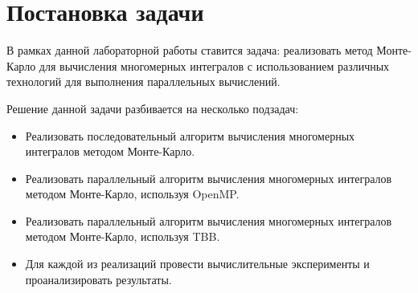 \documentclass{report}
\begin{document}
\section*{Постановка задачи}
В рамках данной лабораторной работы ставится задача: реализовать метод Монте-Карло для вычисления многомерных интегралов с использованием различных технологий для выполнения параллельных вычислений.
\par Решение данной задачи разбивается на несколько подзадач:
\begin{itemize}
\item Реализовать последовательный алгоритм вычисления многомерных интегралов методом Монте-Карло.
\item Реализовать параллельный алгоритм вычисления многомерных интегралов методом Монте-Карло, используя OpenMP.
\item Реализовать параллельный алгоритм вычисления многомерных интегралов методом Монте-Карло, используя TBB.
\item Для каждой из реализаций провести вычислительные эксперименты и проанализировать результаты.
\end{itemize}

\newpage
\end{document}

